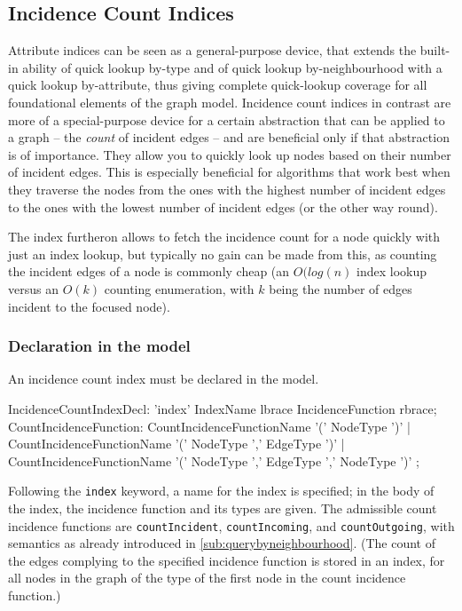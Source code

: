 \subsection{Incidence Count Indices}
Attribute indices can be seen as a general-purpose device, that extends the built-in ability of quick lookup by-type and of quick lookup by-neighbourhood with a quick lookup by-attribute, thus giving complete quick-lookup coverage for all foundational elements of the graph model.
Incidence count indices in contrast are more of a special-purpose device for a certain abstraction that can be applied to a graph -- the \emph{count} of incident edges -- and are beneficial only if that abstraction is of importance.
They allow you to quickly look up nodes based on their number of incident edges.
This is especially beneficial for algorithms that work best when they traverse the nodes from the ones with the highest number of incident edges to the ones with the lowest number of incident edges (or the other way round).

The index furtheron allows to fetch the incidence count for a node quickly with just an index lookup, 
but typically no gain can be made from this, as counting the incident edges of a node is commonly cheap (an $O(log(n)$ index lookup versus an $O(k)$ counting enumeration, with $k$ being the number of edges incident to the focused node).

\subsubsection*{Declaration in the model}

An incidence count index must be declared in the model.

\begin{rail}
IncidenceCountIndexDecl: 'index' IndexName lbrace IncidenceFunction rbrace;
CountIncidenceFunction: 
  CountIncidenceFunctionName '(' NodeType ')' |
  CountIncidenceFunctionName '(' NodeType ',' EdgeType ')' |
  CountIncidenceFunctionName '(' NodeType ',' EdgeType ',' NodeType ')'
  ;
\end{rail}\label{IncidenceCountIndexDecl}

Following the \texttt{index} keyword, a name for the index is specified; in the body of the index, the incidence function and its types are given.
The admissible count incidence functions are \texttt{countIncident}, \texttt{countIncoming}, and \texttt{countOutgoing}, with semantics as already introduced in \ref{sub:querybyneighbourhood}.
(The count of the edges complying to the specified incidence function is stored in an index, for all nodes in the graph of the type of the first node in the count incidence function.)

